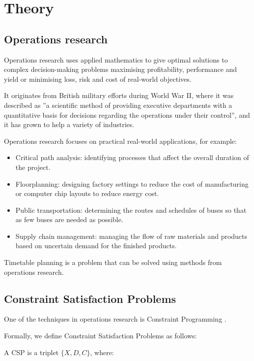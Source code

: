 \chapter{Theory}

\section{Operations research}

Operations research \cite{ORWiki} uses applied mathematics to give optimal solutions to complex decision-making problems maximising profitability, performance and yield or minimising loss, risk and cost of real-world objectives.

It originates from British military efforts during World War II, where it was described as ''a scientific method of providing executive departments with a quantitative basis for decisions regarding the operations under their control'', and it has grown to help a variety of industries. 

Operations research focuses on practical real-world applications, for example:

\begin{itemize}
\item Critical path analysis: identifying processes that affect the overall duration of the project.
\item Floorplanning: designing factory settings to reduce the cost of manufacturing or computer chip layouts to reduce energy cost.
\item Public transportation: determining the routes and schedules of buses so that as few buses are needed as possible.
\item Supply chain management: managing the flow of raw materials and products based on uncertain demand for the finished products.
\end{itemize}

Timetable planning is a problem that can be solved using methods from operations research.

\section{Constraint Satisfaction Problems}

One of the techniques in operations research is Constraint Programming \cite{CSPWiki}.

Formally, we define Constraint Satisfaction Problems as follows:

A CSP is a triplet $\{X,D,C\}$, where:

